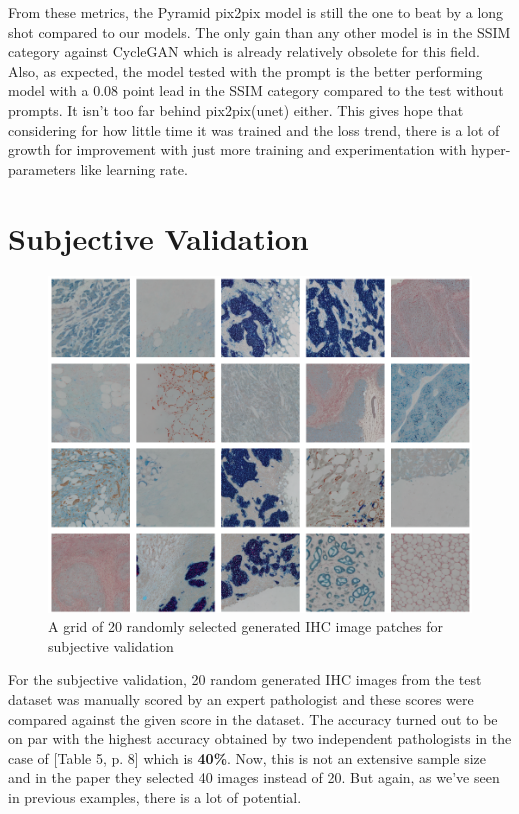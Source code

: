 From these metrics, the Pyramid pix2pix model is still the one to beat by a long shot compared to our models. The only gain than any other model is in the SSIM category against CycleGAN which is already relatively obsolete for this field. Also, as expected, the model tested with the prompt is the better performing model with a 0.08 point lead in the SSIM category compared to the test without prompts. It isn't too far behind pix2pix(unet) either. This gives hope that considering for how little time it was trained and the loss trend, there is a lot of growth for improvement with just more training and experimentation with hyper-parameters like learning rate.

\section{Subjective Validation}

\begin{figure}[h]
    \centering
    \includegraphics[width=1\linewidth]{5_Results/figures/subjective-eval-samples.png}
    \caption{A grid of 20 randomly selected generated IHC image patches for subjective validation}
    \label{fig:sub-eval-grid}
\end{figure}

For the subjective validation,  20 random generated IHC images from the test dataset was manually scored by an expert pathologist and these scores were compared against the given score in the dataset. The accuracy turned out to be on par with the highest accuracy obtained by two independent pathologists in the case of \textcite{Liu2022BCI:Pix2pix}[Table 5, p. 8] which is \textbf{40\%}. Now, this is not an extensive sample size and in the paper they selected 40 images instead of 20. But again, as we've seen in previous examples, there is a lot of potential.


